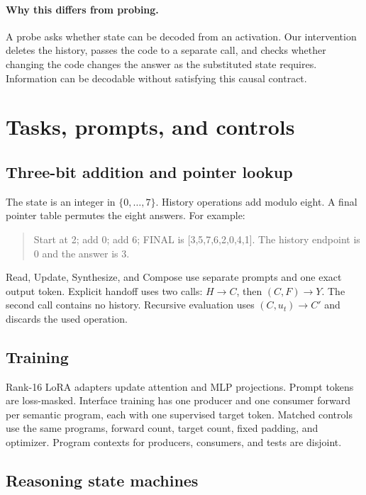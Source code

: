 \documentclass[10pt]{article}
\newcommand{\code}{C}
\begin{document}
\paragraph{Why this differs from probing.}
A probe asks whether state can be decoded from an activation. Our intervention
deletes the history, passes the code to a separate call, and checks whether
changing the code changes the answer as the substituted state requires.
Information can be decodable without satisfying this causal contract.

\section{Tasks, prompts, and controls}

\subsection{Three-bit addition and pointer lookup}

The state is an integer in $\{0,\ldots,7\}$. History operations add modulo
eight. A final pointer table permutes the eight answers. For example:
\begin{quote}\small
Start at 2; add 0; add 6; FINAL is [3,5,7,6,2,0,4,1].
The history endpoint is 0 and the answer is 3.
\end{quote}
Read, Update, Synthesize, and Compose use separate prompts and one exact output
token. Explicit handoff uses two calls: $H\!\to\!\code$, then
$(\code,F)\!\to\!Y$. The second call contains no history. Recursive evaluation
uses $(\code,u_t)\!\to\!\code'$ and discards the used operation.

\subsection{Training}

Rank-16 LoRA adapters update attention and MLP projections. Prompt tokens are
loss-masked. Interface training has one producer and one consumer forward per
semantic program, each with one supervised target token. Matched controls use
the same programs, forward count, target count, fixed padding, and optimizer.
Program contexts for producers, consumers, and tests are disjoint.

\subsection{Reasoning state machines}
\end{document}
